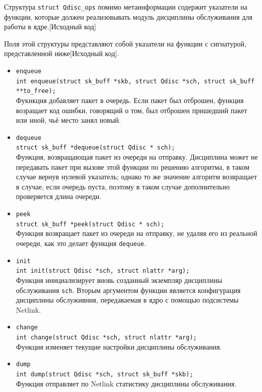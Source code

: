 	Структура \lstinline{struct Qdisc_ops} помимо метаинформации содержит указатели на функции,
	которые должен реализовывать модуль дисциплины обслуживания для работы в ядре.[Исходный код]

	Поля этой структуры представляют собой указатели на функции с сигнатурой,
	представленной ниже[Исходный код].
	\begin{itemize}
		\item \lstinline{enqueue}\\
   		    \lstinline{int enqueue(struct sk_buff *skb, struct Qdisc *sch, struct sk_buff **to_free);} \\
			Фукнкция добавляет пакет в очередь. Если пакет был отброшен, функция
			возращает код ошибки, говорящий о том, был отброшен пришедший пакет или
			иной, чьё место занял новый.
		\item \lstinline{dequeue}\\
			\lstinline{struct sk_buff *dequeue(struct Qdisc * sch);} \\
			Функция, возвращающая пакет из очереди на отправку. Дисциплина
			может не передавать пакет при вызове этой функции по решению
			алгоритма, в таком случае вернув нулевой указатель; 
			однако то же значение алгоритм возвращает в случае, если очередь
			пуста, поэтому в таком случае дополнительно проверяется длина
			очереди.
		\item \lstinline{peek}\\
			\lstinline{struct sk_buff *peek(struct Qdisc * sch);}\\
			Функция возвращает пакет из очереди на отправку, не удаляя его из реальной очереди,
			как это делает функция \lstinline{dequeue}.
		\item \lstinline{init}\\
			  \lstinline{int init(struct Qdisc *sch, struct nlattr *arg);}\\
			  Функция инициализирует вновь созданный экземпляр дисциплины обслуживания \texttt{sch}.
			  Вторым аргументом функции является конфигурация дисциплины обслуживния, передаваемая
			  в ядро с помощью подсистемы Netlink.
		\item \lstinline{change}\\
			  \lstinline{int change(struct Qdisc *sch, struct nlattr *arg);}\\
			  Функция изменяет текущие настройки дисциплины обслуживания. 
		\item \lstinline{dump}\\
			  \lstinline{int dump(struct Qdisc *sch, struct sk_buff *skb);}\\
			  Функция отправляет по Netlink статистику дисциплины обслуживания.
	\end{itemize}

